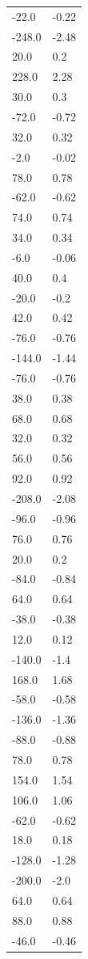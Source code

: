 \begin{longtable}{ll}
-22.0 & -0.22 \\
-248.0 & -2.48 \\
20.0 & 0.2 \\
228.0 & 2.28 \\
30.0 & 0.3 \\
-72.0 & -0.72 \\
32.0 & 0.32 \\
-2.0 & -0.02 \\
78.0 & 0.78 \\
-62.0 & -0.62 \\
74.0 & 0.74 \\
34.0 & 0.34 \\
-6.0 & -0.06 \\
40.0 & 0.4 \\
-20.0 & -0.2 \\
42.0 & 0.42 \\
-76.0 & -0.76 \\
-144.0 & -1.44 \\
-76.0 & -0.76 \\
38.0 & 0.38 \\
68.0 & 0.68 \\
32.0 & 0.32 \\
56.0 & 0.56 \\
92.0 & 0.92 \\
-208.0 & -2.08 \\
-96.0 & -0.96 \\
76.0 & 0.76 \\
20.0 & 0.2 \\
-84.0 & -0.84 \\
64.0 & 0.64 \\
-38.0 & -0.38 \\
12.0 & 0.12 \\
-140.0 & -1.4 \\
168.0 & 1.68 \\
-58.0 & -0.58 \\
-136.0 & -1.36 \\
-88.0 & -0.88 \\
78.0 & 0.78 \\
154.0 & 1.54 \\
106.0 & 1.06 \\
-62.0 & -0.62 \\
18.0 & 0.18 \\
-128.0 & -1.28 \\
-200.0 & -2.0 \\
64.0 & 0.64 \\
88.0 & 0.88 \\
-46.0 & -0.46 \\

\end{longtable}
